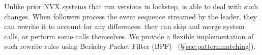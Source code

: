 Unlike prior NVX systems that run versions in lockstep, \varan is able
to deal with such changes.  When followers process the
event sequence streamed by the leader, they can rewrite it to account
for any differences: \eg they can skip and merge system calls, or perform some
calls themselves.  We provide a flexible implementation of such rewrite rules
using Berkeley Packet Filter (BPF)~\cite{bpf} (\S\ref{sec:patternmatching}).

